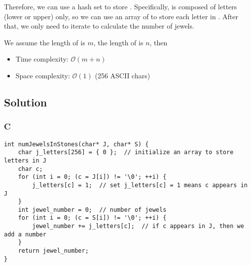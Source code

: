 Therefore, we can use a hash set to store . Specifically,  is composed of letters (lower or upper) only, so we can use an array of  to store each letter in . After that, we only need to iterate  to calculate the number of jewels.

We assume the length of  is $m$, the length of  is $n$, then
\begin{itemize}
    \item Time complexity: $\mathcal{O}(m + n)$
    \item Space complexity: $\mathcal{O}(1)$ (256 ASCII chars)
\end{itemize}

\subsection*{Solution}
\subsubsection{C}
\begin{verbatim}
int numJewelsInStones(char* J, char* S) {
    char j_letters[256] = { 0 };  // initialize an array to store letters in J
    char c;
    for (int i = 0; (c = J[i]) != '\0'; ++i) {
        j_letters[c] = 1;  // set j_letters[c] = 1 means c appears in J
    }
    int jewel_number = 0;  // number of jewels
    for (int i = 0; (c = S[i]) != '\0'; ++i) {
        jewel_number += j_letters[c];  // if c appears in J, then we add a number
    }
    return jewel_number;
}
\end{verbatim}

\newpage

